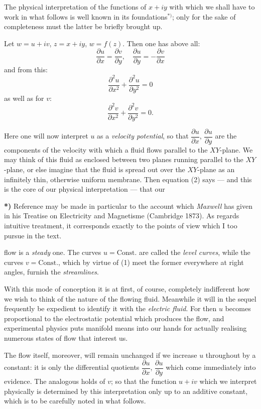 \documentclass{article}
\begin{document}
The physical interpretation of the functions of $x + iy$ with which we shall have to work in what follows is well known in its foundations${}^{*)}$; only for the sake of completeness must the latter be briefly brought up.

Let $w = u + iv$, $z = x + iy$, $w = f(z)$. Then one has above all:
\[ \frac{\partial u}{\partial x} = \frac{\partial v}{\partial y}, \quad \frac{\partial u}{\partial y} = -\frac{\partial v}{\partial x} \tag{1} \]
and from this:
\[ \frac{\partial^{2} u}{\partial x^{2}} + \frac{\partial^{2} u}{\partial y^{2}} = 0 \tag{2} \]
as well as for $v$:
\[ \frac{\partial^{2} v}{\partial x^{2}} + \frac{\partial^{2} v}{\partial y^{2}} = 0. \tag{3} \]

Here one will now interpret $u$ as a \emph{velocity potential}, so that $\dfrac{\partial u}{\partial x}$, $\dfrac{\partial u}{\partial y}$ are the components of the velocity with which a fluid flows parallel to the $XY$-plane. We may think of this fluid as enclosed between two planes running parallel to the $XY$-plane, or else imagine that the fluid is spread out over the $XY$-plane as an infinitely thin, otherwise uniform membrane. Then equation (2) says --- and this is the core of our physical interpretation --- that our

\textbf{*)} Reference may be made in particular to the account which \emph{Maxwell} has given in his Treatise on Electricity and Magnetisme (Cambridge 1873). As regards intuitive treatment, it corresponds exactly to the points of view which I too pursue in the text.

flow is a \emph{steady} one. The curves $u = \text{Const.}$ are called the \emph{level curves}, while the curves $v = \text{Const.}$, which by virtue of (1) meet the former everywhere at right angles, furnish the \emph{streamlines}.

With this mode of conception it is at first, of course, completely indifferent how we wish to think of the nature of the flowing fluid. Meanwhile it will in the sequel frequently be expedient to identify it with the \emph{electric fluid}. For then $u$ becomes proportional to the electrostatic potential which produces the flow, and experimental physics puts manifold means into our hands for actually realising numerous states of flow that interest us.

The flow itself, moreover, will remain unchanged if we increase $u$ throughout by a constant: it is only the differential quotients $\dfrac{\partial u}{\partial x}$, $\dfrac{\partial u}{\partial y}$ which come immediately into evidence. The analogous holds of $v$; so that the function $u + iv$ which we interpret physically is determined by this interpretation only up to an additive constant, which is to be carefully noted in what follows.
\end{document}
